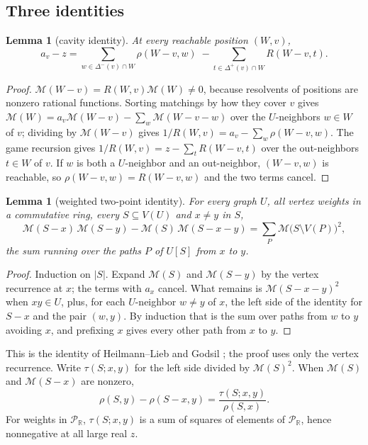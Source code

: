 \documentclass[11pt]{amsart}
\theoremstyle{plain}
\newtheorem{lemma}[theorem]{Lemma}
\theoremstyle{definition}
\theoremstyle{remark}
\numberwithin{equation}{section}
\newcommand{\RR}{\mathbb{R}}
\newcommand{\Puis}{\mathcal{P}_{\RR}}
\newcommand{\Mpot}{\mathcal{M}}           %
\begin{document}
\subsection{Three identities}

\begin{lemma}[cavity identity]\label{lem:cavity}
At every reachable position $(W,v)$,
\[
a_v-z=\sum_{w\in\Delta^{-}(v)\cap W}\rho(W-v,w)\;-\sum_{t\in\Delta^{+}(v)\cap W}R(W-v,t).
\]
\end{lemma}
\begin{proof}
$\Mpot(W-v)=R(W,v)\Mpot(W)\neq0$, because resolvents of positions are nonzero rational functions. Sorting matchings by how they cover $v$ gives $\Mpot(W)=a_v\Mpot(W-v)-\sum_{w}\Mpot(W-v-w)$ over the $U$-neighbors $w\in W$ of $v$; dividing by $\Mpot(W-v)$ gives $1/R(W,v)=a_v-\sum_w\rho(W-v,w)$. The game recursion gives $1/R(W,v)=z-\sum_tR(W-v,t)$ over the out-neighbors $t\in W$ of $v$. If $w$ is both a $U$-neighbor and an out-neighbor, $(W-v,w)$ is reachable, so $\rho(W-v,w)=R(W-v,w)$ and the two terms cancel.
\end{proof}

\begin{lemma}[weighted two-point identity]\label{lem:two-point}
For every graph $U$, all vertex weights in a commutative ring, every $S\subseteq V(U)$ and $x\neq y$ in $S$,
\[
\Mpot(S-x)\,\Mpot(S-y)-\Mpot(S)\,\Mpot(S-x-y)=\sum_{P}\Mpot\bigl(S\setminus V(P)\bigr)^{2},
\]
the sum running over the paths $P$ of $U[S]$ from $x$ to $y$.
\end{lemma}
\begin{proof}
Induction on $|S|$. Expand $\Mpot(S)$ and $\Mpot(S-y)$ by the vertex recurrence at $x$; the terms with $a_x$ cancel. What remains is $\Mpot(S-x-y)^2$ when $xy\in U$, plus, for each $U$-neighbor $w\neq y$ of $x$, the left side of the identity for $S-x$ and the pair $(w,y)$. By induction that is the sum over paths from $w$ to $y$ avoiding $x$, and prefixing $x$ gives every other path from $x$ to $y$.
\end{proof}

This is the identity of Heilmann--Lieb and Godsil \cite{HeilmannLieb,GodsilBook}; the proof uses only the vertex recurrence. Write $\tau(S;x,y)$ for the left side divided by $\Mpot(S)^2$. When $\Mpot(S)$ and $\Mpot(S-x)$ are nonzero,
\begin{equation}\label{eq:green-difference}
\rho(S,y)-\rho(S-x,y)=\frac{\tau(S;x,y)}{\rho(S,x)}.
\end{equation}
For weights in $\Puis$, $\tau(S;x,y)$ is a sum of squares of elements of $\Puis$, hence nonnegative at all large real $z$.
\end{document}

